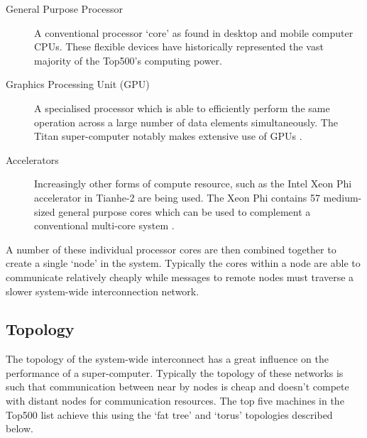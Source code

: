 			\begin{description}
				
				\item[General Purpose Processor] A conventional processor `core' as
				found in desktop and mobile computer CPUs. These flexible devices have
				historically represented the vast majority of the Top500's computing
				power.
				
				\item[Graphics Processing Unit (GPU)] A specialised processor which is
				able to efficiently perform the same operation across a large number of
				data elements simultaneously. The Titan super-computer notably makes
				extensive use of GPUs \cite{bland12}.
				
				\item[Accelerators] Increasingly other forms of compute resource, such
				as the Intel Xeon Phi accelerator in Tianhe-2 are being used. The Xeon
				Phi contains 57 medium-sized general purpose cores which can be used to
				complement a conventional multi-core system \cite{dongarra13}.
				
			\end{description}
			
			A number of these individual processor cores are then combined together to
			create a single `node' in the system. Typically the cores within a node
			are able to communicate relatively cheaply while messages to remote nodes
			must traverse a slower system-wide interconnection network.
			
		
		\subsection{Topology}
			
			
			The topology of the system-wide interconnect has a great influence on the
			performance of a super-computer. Typically the topology of these networks
			is such that communication between near by nodes is cheap and doesn't
			compete with distant nodes for communication resources. The top five
			machines in the Top500 list achieve this using the `fat tree' and `torus'
			topologies described below.
			
